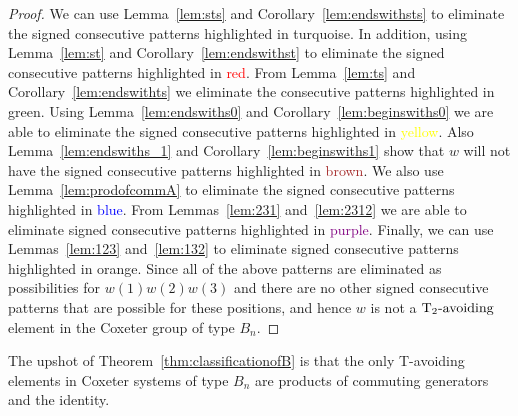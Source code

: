 \begin{theorem}
\begin{proof}
We can use Lemma~\ref{lem:sts} and Corollary~\ref{lem:endswithsts} to eliminate the signed consecutive patterns highlighted in \textcolor{turq}{turquoise}. In addition, using Lemma~\ref{lem:st} and Corollary~\ref{lem:endswithst} to eliminate the signed consecutive patterns highlighted in \textcolor{red}{red}. From Lemma~\ref{lem:ts} and Corollary~\ref{lem:endswithts} we eliminate the consecutive patterns highlighted in \textcolor{ggreen}{green}.  Using Lemma~\ref{lem:endswiths0} and Corollary~\ref{lem:beginswiths0} we are able to eliminate the signed consecutive patterns highlighted in \textcolor{yellow}{yellow}. Also Lemma~\ref{lem:endswiths_1} and Corollary~\ref{lem:beginswiths1} show that $w$ will not have the signed consecutive patterns highlighted in \textcolor{brown}{brown}. We also use Lemma~\ref{lem:prodofcommA} to eliminate the signed consecutive patterns highlighted in \textcolor{blue}{blue}. From Lemmas~\ref{lem:231} and~\ref{lem:2312} we are able to eliminate signed consecutive patterns highlighted in \textcolor{purple}{purple}. Finally, we can use Lemmas~\ref{lem:123} and~\ref{lem:132} to eliminate signed consecutive patterns highlighted in \textcolor{orange2}{orange}. Since all of the above patterns are eliminated as possibilities for $w(1)w(2)w(3)$ and there are no other signed consecutive patterns that are possible for these positions, and hence $w$ is not a $\operatorname{T_2-\mathrm{avoiding}}$ element in the Coxeter group of type $B_n$.
\end{proof}
\end{theorem}


The upshot of Theorem~\ref{thm:classificationofB} is that the only T-avoiding elements in Coxeter systems of type $B_n$ are products of commuting generators and the identity.